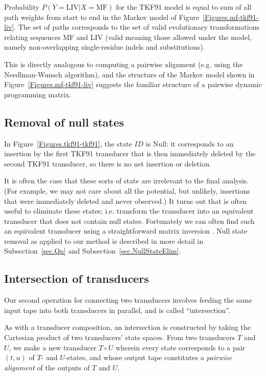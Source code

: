 \documentclass{article}
\newcommand{\secref}[1]{Subsection~\ref{sec.#1}}
\newcommand{\seclabel}[1]{\label{sec.#1}}
\newcommand{\figref}[1]{Figure~\ref{Figures.#1}}
\newcommand\fork{\circ}
\begin{document}
Probability $P(Y=\mbox{LIV}|X=\mbox{MF})$ for the TKF91 model
is equal to sum of all path weights from start to end in the Markov model of \figref{mf-tkf91-liv}. 
The set of paths corresponds to the set of valid evolutionary transformations relating
sequences MF and LIV (valid meaning those allowed under the model, namely non-overlapping single-residue indels and substitutions).  

This is directly analogous to computing a pairwise alignment (e.g. using the Needlman-Wunsch algorithm), and the structure of the Markov model shown in \figref{mf-tkf91-liv} suggests the familiar structure of a pairwise dynamic programming matrix.  

\subsection{Removal of null states}

In \figref{tkf91-tkf91}, the state $ID$ is Null:
it corresponds to an insertion by the first TKF91 transducer
that is then immediately deleted by the second TKF91 transducer,
so there is no net insertion or deletion.

It is often the case that these sorts of state are irrelevant to the final analysis.
(For example, we may not care about all the potential, but unlikely,
insertions that were immediately deleted and never observed.)
It turns out that is often useful to eliminate these states;
i.e. transform the transducer into an equivalent transducer that does not contain null states.
Fortunately we can often find such an equivalent transducer
using a straightforward matrix inversion \cite{BradleyHolmes2009}.  
Null state removal as applied to our method is described in
more detail in \secref{Qn} and \secref{NullStateElim}.  


\subsection{Intersection of transducers}
\seclabel{Tutorial.Intersection}

Our second operation for connecting two transducers
involves feeding the same input tape into both transducers in parallel,
and is called ``intersection''.

As with a transducer composition,
an intersection is constructed by taking the Cartesian product of two transducers' state spaces.
From two transducers $T$ and $U$,
we make a new transducer $T \fork U$
wherein every state corresponds to a pair $(t,u)$ of $T$- and $U$-states,
and whose output tape constitutes a {\em pairwise alignment} of the outputs of $T$ and $U$.
\end{document}
